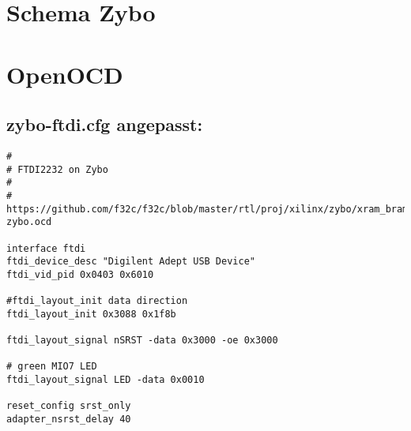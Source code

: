 






\section{Schema Zybo}
\label{anhang:schemaZybo}





\section{OpenOCD}

\subsection{zybo-ftdi.cfg angepasst:}
\label{anhang:zybo-ftdi.cfg}
\lstset{language=tcl}
\begin{lstlisting}
#
# FTDI2232 on Zybo
#
#  https://github.com/f32c/f32c/blob/master/rtl/proj/xilinx/zybo/xram_bram_hdmi_ise/ftdi-zybo.ocd 

interface ftdi
ftdi_device_desc "Digilent Adept USB Device"
ftdi_vid_pid 0x0403 0x6010

#ftdi_layout_init data direction
ftdi_layout_init 0x3088 0x1f8b

ftdi_layout_signal nSRST -data 0x3000 -oe 0x3000

# green MIO7 LED
ftdi_layout_signal LED -data 0x0010

reset_config srst_only
adapter_nsrst_delay 40
\end{lstlisting}


